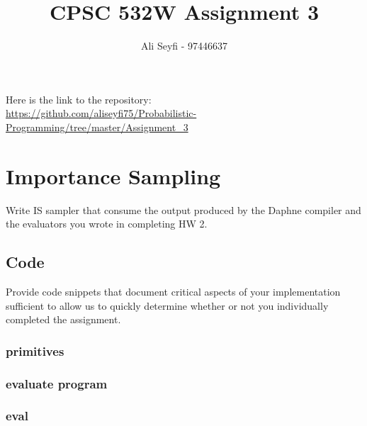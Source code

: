 \documentclass{article}
\def\blu#1{{\color{blu}#1}}
\begin{document}
\title{\vspace{-20mm}
CPSC 532W Assignment 3}
\author{Ali Seyfi - 97446637}
\date{}
\maketitle

Here is the link to the repository:\\
\url{https://github.com/aliseyfi75/Probabilistic-Programming/tree/master/Assignment_3}

\section{Importance Sampling}

\blu{Write IS sampler that consume the output produced by the Daphne compiler and the evaluators you wrote in completing HW 2. }

\subsection{Code}
\blu{Provide code snippets that document critical aspects of your implementation sufficient to allow us to quickly determine whether or not you individually completed the assignment.}
\subsubsection{primitives}
\label{primitives}

\pagebreak

\pagebreak


\subsubsection{evaluate program}

\pagebreak
\subsubsection{eval}

\pagebreak
\end{document}
